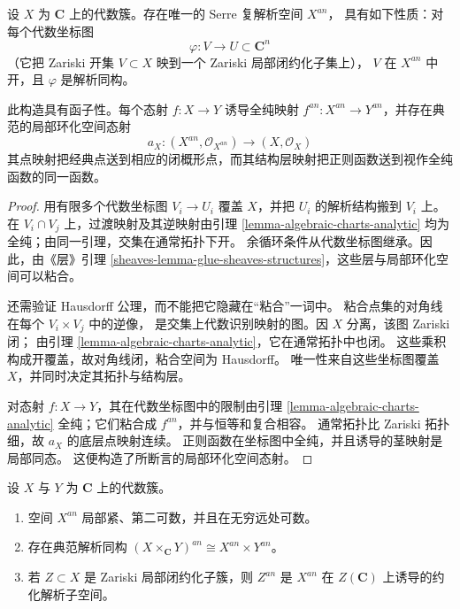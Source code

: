 \begin{proposition}
\label{proposition-analytification}
设 $X$ 为 $\mathbf C$ 上的代数簇。存在唯一的 Serre 复解析空间 $X^{an}$，
具有如下性质：对每个代数坐标图
$$
\varphi : V \longrightarrow U \subset \mathbf C^n
$$
（它把 Zariski 开集 $V \subset X$ 映到一个 Zariski 局部闭约化子集上），
$V$ 在 $X^{an}$ 中开，且 $\varphi$ 是解析同构。

此构造具有函子性。每个态射 $f : X \to Y$ 诱导全纯映射
$f^{an} : X^{an} \to Y^{an}$，并存在典范的局部环化空间态射
$$
a_X : (X^{an}, \mathcal O_{X^{an}}) \longrightarrow
(X, \mathcal O_X)
$$
其点映射把经典点送到相应的闭概形点，而其结构层映射把正则函数送到视作全纯函数的同一函数。
\end{proposition}

\begin{proof}
用有限多个代数坐标图 $V_i \to U_i$ 覆盖 $X$，并把 $U_i$ 的解析结构搬到 $V_i$ 上。
在 $V_i \cap V_j$ 上，过渡映射及其逆映射由引理
\ref{lemma-algebraic-charts-analytic} 均为全纯；由同一引理，交集在通常拓扑下开。
余循环条件从代数坐标图继承。因此，由《层》引理
\ref{sheaves-lemma-glue-sheaves-structures}，这些层与局部环化空间可以粘合。

还需验证 Hausdorff 公理，而不能把它隐藏在“粘合”一词中。
粘合点集的对角线在每个 $V_i \times V_j$ 中的逆像，
是交集上代数识别映射的图。因 $X$ 分离，该图 Zariski 闭；
由引理 \ref{lemma-algebraic-charts-analytic}，它在通常拓扑中也闭。
这些乘积构成开覆盖，故对角线闭，粘合空间为 Hausdorff。
唯一性来自这些坐标图覆盖 $X$，并同时决定其拓扑与结构层。

对态射 $f : X \to Y$，其在代数坐标图中的限制由引理
\ref{lemma-algebraic-charts-analytic} 全纯；它们粘合成 $f^{an}$，并与恒等和复合相容。
通常拓扑比 Zariski 拓扑细，故 $a_X$ 的底层点映射连续。
正则函数在坐标图中全纯，并且诱导的茎映射是局部同态。
这便构造了所断言的局部环化空间态射。
\end{proof}

\begin{lemma}
\label{lemma-analytification-properties}
设 $X$ 与 $Y$ 为 $\mathbf C$ 上的代数簇。
\begin{enumerate}
\item 空间 $X^{an}$ 局部紧、第二可数，并且在无穷远处可数。
\item 存在典范解析同构
$(X \times_{\mathbf C} Y)^{an} \cong X^{an} \times Y^{an}$。
\item 若 $Z \subset X$ 是 Zariski 局部闭约化子簇，则 $Z^{an}$ 是
$X^{an}$ 在 $Z(\mathbf C)$ 上诱导的约化解析子空间。
\end{enumerate}
\end{lemma}

